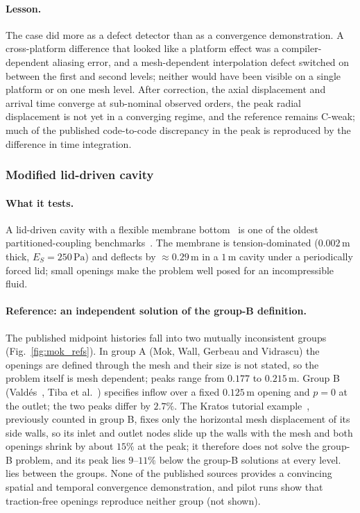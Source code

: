 \paragraph{Lesson.}
The case did more as a defect detector than as a convergence demonstration.
A cross-platform difference that looked like a platform effect was a compiler-dependent aliasing error, and a mesh-dependent interpolation defect switched on between the first and second levels; neither would have been visible on a single platform or on one mesh level.
After correction, the axial displacement and arrival time converge at sub-nominal observed orders, the peak radial displacement is not yet in a converging regime, and the reference remains C-weak; much of the published code-to-code discrepancy in the peak is reproduced by the difference in time integration.

\subsubsection{Modified lid-driven cavity}\label{sec:mok}

\paragraph{What it tests.}
A lid-driven cavity with a flexible membrane bottom~\citep{Wall1999, Mok2001} is one of the oldest partitioned-coupling benchmarks~\citep{Gerbeau2003, kuttler2008fixed, Kassiotis2011}.
The membrane is tension-dominated ($0.002\,\mathrm{m}$ thick, $E_S = 250\,\mathrm{Pa}$) and deflects by $\approx0.29\,\mathrm{m}$ in a $1\,\mathrm{m}$ cavity under a periodically forced lid; small openings make the problem well posed for an incompressible fluid.

\paragraph{Reference: an independent solution of the group-B definition.}
The published midpoint histories fall into two mutually inconsistent groups (Fig.~\ref{fig:mok_refs}).
In group A (Mok, Wall, Gerbeau and Vidrascu) the openings are defined through the mesh and their size is not stated, so the problem itself is mesh dependent; peaks range from $0.177$ to $0.215\,\mathrm{m}$.
Group B (Vald\'es~\citep{Valdes2007}, Tiba et al.~\citep{Tiba2026}) specifies inflow over a fixed $0.125\,\mathrm{m}$ opening and $p = 0$ at the outlet; the two peaks differ by $2.7\%$.
The Kratos tutorial example~\citep{KratosLDC}, previously counted in group B, fixes only the horizontal mesh displacement of its side walls, so its inlet and outlet nodes slide up the walls with the mesh and both openings shrink by about $15\%$ at the peak; it therefore does not solve the group-B problem, and its peak lies $9$--$11\%$ below the group-B solutions at every level.
\citet{Kassiotis2011} lies between the groups.
None of the published sources provides a convincing spatial and temporal convergence demonstration, and pilot runs show that traction-free openings reproduce neither group (not shown).


